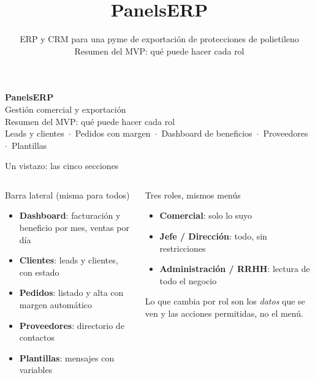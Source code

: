 \documentclass[aspectratio=169,11pt]{beamer}
\title{PanelsERP}
\subtitle{ERP y CRM para una pyme de exportaci\'on de protecciones de polietileno\\[2pt]Resumen del MVP: qu\'e puede hacer cada rol}
\date{}
\begin{document}
\begin{frame}[plain]
  \vfill
  \begin{center}
    {\Huge\bfseries\color{brandDark} PanelsERP}\\[6pt]
    {\Large\color{brand} Gesti\'on comercial y exportaci\'on}\\[18pt]
    {\large Resumen del MVP: qu\'e puede hacer cada rol}\\[4pt]
    {\small\color{gray} Leads y clientes \,$\cdot$\, Pedidos con margen \,$\cdot$\, Dashboard de beneficios \,$\cdot$\, Proveedores \,$\cdot$\, Plantillas}
  \end{center}
  \vfill
\end{frame}

\begin{frame}{Un vistazo: las cinco secciones}
  \begin{columns}[T]
    \begin{block}{Barra lateral (misma para todos)}
      \begin{itemize}
        \item \textbf{Dashboard}: facturaci\'on y beneficio por mes, ventas por d\'ia
        \item \textbf{Clientes}: leads y clientes, con estado
        \item \textbf{Pedidos}: listado y alta con margen autom\'atico
        \item \textbf{Proveedores}: directorio de contactos
        \item \textbf{Plantillas}: mensajes con variables
      \end{itemize}
    \end{block}
    \begin{block}{Tres roles, mismos men\'us}
      \begin{itemize}
        \item \textbf{Comercial}: solo lo suyo
        \item \textbf{Jefe / Direcci\'on}: todo, sin restricciones
        \item \textbf{Administraci\'on / RRHH}: lectura de todo el negocio
      \end{itemize}
      \vspace{4pt}
      \small Lo que cambia por rol son los \emph{datos} que se ven y las acciones permitidas, no el men\'u.
    \end{block}
  \end{columns}
\end{frame}
\end{document}
